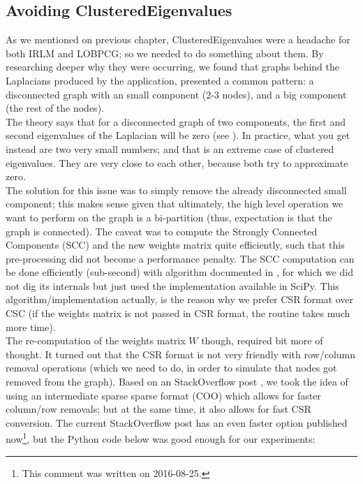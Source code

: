 \subsection{Avoiding \gls{ClusteredEigenvalues}}
\label{sub:avoid-clust-eigv}

As we mentioned on previous chapter, \gls{ClusteredEigenvalues} were a
headache for both \gls{IRLM} and \gls{LOBPCG}; so we needed to do something
about them. By researching deeper why they were occurring, we found
that graphs behind the \gls{Laplacian}s produced by the
application, presented a common pattern: a disconnected graph with an
small component (2-3 nodes), and a big component (the rest of the
nodes). \\

The theory says that for a disconnected graph of two components, the
first and second eigenvalues of the \gls{Laplacian} will be zero (see
\cite{luxburg07}). In practice, what you get instead are two very
small numbers; and that is an extreme case of clustered
eigenvalues. They are very close to each other, because both try to
approximate zero. \\

The solution for this issue was to simply remove the already
disconnected small component; this makes sense given that ultimately,
the high level operation we want to perform on the graph is a
bi-partition (thus, expectation is that the graph is connected). The
caveat was to compute the Strongly Connected Components (\gls{SCC}) and the
new weights matrix quite efficiently, such that this pre-processing
did not become a performance penalty. The \gls{SCC} computation can be done
efficiently (sub-second) with algorithm documented in \cite{pearce05},
for which we did not dig its internals but just used the
implementation available in SciPy. This  
algorithm/implementation actually, is the reason why we prefer CSR
format over CSC (if the weights matrix is not passed in CSR format,
the routine takes much more time). \\

\newpage
The re-computation of the weights matrix $W$ though, required bit more
of thought. It turned out that the CSR format is not very friendly
with row/column removal operations (which we need to do, in order to
simulate that nodes got removed from the graph). Based on an
StackOverflow post \cite{alim15}, we took the idea of using an
intermediate sparse sparse format (COO) which allows for faster
column/row removals; but at the same time, it also allows for fast CSR
conversion. The current StackOverflow post has an even faster option
published now\footnote{This comment was written on 2016-08-25.}, but the
Python code below was good enough for our experiments: 

